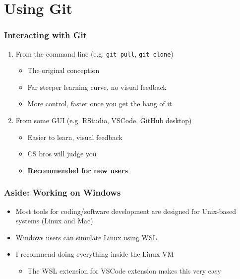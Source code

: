 \documentclass{ali-presentation}
\begin{document}
\section{Using Git}

\begin{frame}
    \frametitle{Interacting with Git}

    \begin{enumerate}
        \item From the command line (e.g. \texttt{git pull}, \texttt{git clone})
        \begin{itemize}
            \item The original conception
            \item Far steeper learning curve, no visual feedback
            \item More control, faster once you get the hang of it
        \end{itemize}
        \bigskip \pause
        \item From some GUI (e.g. RStudio, VSCode, GitHub desktop)
        \begin{itemize}
            \item Easier to learn, visual feedback
            \item CS bros will judge you
            \pause
            \item \bfseries \color{red}Recommended for new users
        \end{itemize}
    \end{enumerate}

\end{frame}

\begin{frame}
    \frametitle{Aside: Working on Windows}

    \begin{itemize}
        \item Most tools for coding/software development are designed for Unix-based systems (Linux and Mac)
        \item Windows users can simulate Linux using WSL
        \item I recommend doing everything inside the Linux VM
        \begin{itemize}
            \item The WSL extension for VSCode extension makes this very easy
        \end{itemize}
    \end{itemize}

\end{frame}
\end{document}
